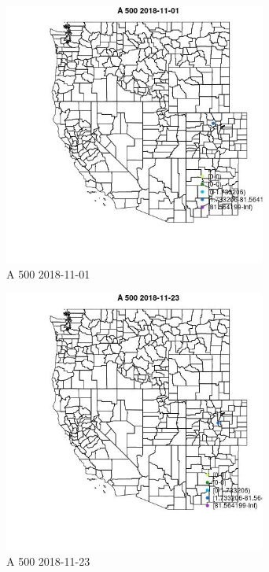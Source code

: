 \begin{figure} 
\centering  
\includegraphics[width=0.77\textwidth]{Code_Outputs/Report_ML_input_PM25_Step4_part_e_de_duplicated_aves_MapObsA_5002018-11-01.jpg} 
\caption{\label{fig:Report_ML_input_PM25_Step4_part_e_de_duplicated_avesMapObsA_5002018-11-01}A 500 2018-11-01} 
\end{figure} 
 

\begin{figure} 
\centering  
\includegraphics[width=0.77\textwidth]{Code_Outputs/Report_ML_input_PM25_Step4_part_e_de_duplicated_aves_MapObsA_5002018-11-23.jpg} 
\caption{\label{fig:Report_ML_input_PM25_Step4_part_e_de_duplicated_avesMapObsA_5002018-11-23}A 500 2018-11-23} 
\end{figure} 
 

